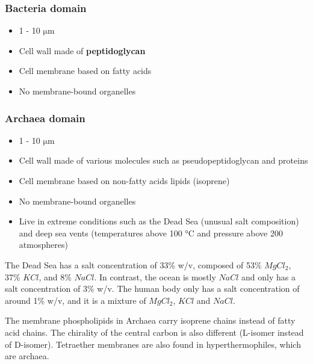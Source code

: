 \documentclass[11pt]{article}
\begin{document}
\subsubsection{Bacteria domain}
\label{sec:org45179b4}
\begin{itemize}
\item 1 - 10 \(\unit{\micro\metre}\)
\item Cell wall made of \textbf{peptidoglycan}
\item Cell membrane based on fatty acids
\item No membrane-bound organelles
\end{itemize}

\newpage
\subsubsection{Archaea domain}
\label{sec:org4c65b3f}
\begin{itemize}
\item 1 - 10 \(\unit{\micro\metre}\)
\item Cell wall made of various molecules such as pseudopeptidoglycan and proteins
\item Cell membrane based on non-fatty acids lipids (isoprene)
\item No membrane-bound organelles
\item Live in extreme conditions such as the Dead Sea (unusual salt composition) and deep sea vents (temperatures above 100 \(\unit{\degreeCelsius}\) and pressure above 200 atmospheres)
\end{itemize}

The Dead Sea has a salt concentration of 33\% w/v, composed of 53\% \(MgCl_2\), 37\% \(KCl\), and 8\% \(NaCl\). In contrast, the ocean is mostly \(NaCl\) and only has a salt concentration of 3\% w/v. The human body only has a salt concentration of around 1\% w/v, and it is a mixture of \(MgCl_2\), \(KCl\) and \(NaCl\).


The membrane phospholipids in Archaea carry isoprene chains instead of fatty acid chains. The chirality of the central carbon is also different (L-isomer instead of D-isomer). Tetraether membranes are also found in hyperthermophiles, which are archaea.

\newpage
\end{document}
